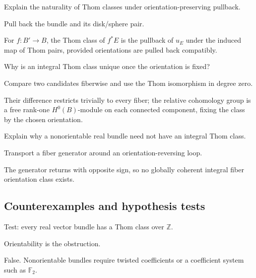\begin{exercise}[Naturality]\label{exr:viii31-ped-07}
Explain the naturality of Thom classes under orientation-preserving pullback.
\end{exercise}
\begin{hint}
Pull back the bundle and its disk/sphere pair.
\end{hint}
\begin{solution}
For $f:B'\to B$, the Thom class of $f^*E$ is the pullback of $u_E$ under the induced map of Thom pairs, provided orientations are pulled back compatibly.
\end{solution}

\begin{exercise}[Uniqueness]\label{exr:viii31-ped-08}
Why is an integral Thom class unique once the orientation is fixed?
\end{exercise}
\begin{hint}
Compare two candidates fiberwise and use the Thom isomorphism in degree zero.
\end{hint}
\begin{solution}
Their difference restricts trivially to every fiber; the relative cohomology group is a free rank-one $H^0(B)$-module on each connected component, fixing the class by the chosen orientation.
\end{solution}

\begin{exercise}\label{exr:viii31-ped-09}
Explain why a nonorientable real bundle need not have an integral Thom class.
\end{exercise}
\begin{hint}
Transport a fiber generator around an orientation-reversing loop.
\end{hint}
\begin{solution}
The generator returns with opposite sign, so no globally coherent integral fiber orientation class exists.
\end{solution}

\subsection*{Counterexamples and hypothesis tests}

\begin{exercise}\label{exr:viii31-ped-10}
Test: every real vector bundle has a Thom class over $\mathbb Z$.
\end{exercise}
\begin{hint}
Orientability is the obstruction.
\end{hint}
\begin{solution}
False. Nonorientable bundles require twisted coefficients or a coefficient system such as $\mathbb F_2$.
\end{solution}

